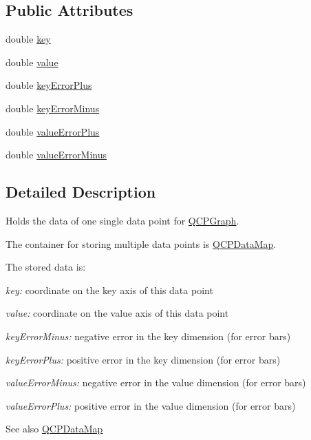 \subsection*{Public Attributes}
\begin{DoxyCompactItemize}
\item 
double \hyperlink{class_q_c_p_data_a2f5ba9aca61bb74f88516e148a4cf71b}{key}
\item 
double \hyperlink{class_q_c_p_data_aefe1ecf8fa2e34ed875b67523e542373}{value}
\item 
double \hyperlink{class_q_c_p_data_ae468c3808107c2fd23052481156ab5b5}{key\+Error\+Plus}
\item 
double \hyperlink{class_q_c_p_data_af107d650b8ee5c3b2961ecddcfb1bccb}{key\+Error\+Minus}
\item 
double \hyperlink{class_q_c_p_data_ad26912552d03485ea20d91dcad16aa8f}{value\+Error\+Plus}
\item 
double \hyperlink{class_q_c_p_data_a51d8f42bf4d49a1f263531e70cadd6a3}{value\+Error\+Minus}
\end{DoxyCompactItemize}


\subsection{Detailed Description}
Holds the data of one single data point for \hyperlink{class_q_c_p_graph}{Q\+C\+P\+Graph}. 

The container for storing multiple data points is \hyperlink{qcustomplot_8h_a84a9c4a4c2216ccfdcb5f3067cda76e3}{Q\+C\+P\+Data\+Map}.

The stored data is\+: \begin{DoxyItemize}
\item {\itshape key\+:} coordinate on the key axis of this data point \item {\itshape value\+:} coordinate on the value axis of this data point \item {\itshape key\+Error\+Minus\+:} negative error in the key dimension (for error bars) \item {\itshape key\+Error\+Plus\+:} positive error in the key dimension (for error bars) \item {\itshape value\+Error\+Minus\+:} negative error in the value dimension (for error bars) \item {\itshape value\+Error\+Plus\+:} positive error in the value dimension (for error bars)\end{DoxyItemize}
\begin{DoxySeeAlso}{See also}
\hyperlink{qcustomplot_8h_a84a9c4a4c2216ccfdcb5f3067cda76e3}{Q\+C\+P\+Data\+Map} 
\end{DoxySeeAlso}


